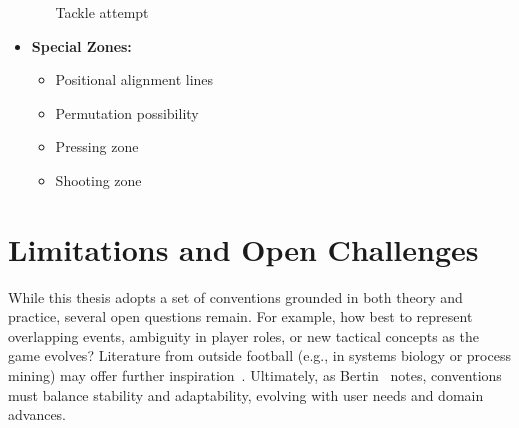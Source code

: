 \documentclass[11pt,a4paper,openright]{report}
\begin{document}
\begin{itemize}
\begin{itemize}
\begin{tikzpicture}[scale=0.5,baseline=-0.6ex]
        \end{tikzpicture}
        \quad Tackle attempt
    \end{itemize}
    \item \textbf{Special Zones:}
    \begin{itemize}
        \item {}
        \quad Positional alignment lines
        \item {}
        \quad Permutation possibility
        \item {}
        \quad Pressing zone
        \item {}
        \quad Shooting zone
    \end{itemize}
\end{itemize}

\section{Limitations and Open Challenges}
While this thesis adopts a set of conventions grounded in both theory and practice, several open questions remain. For example, how best to represent overlapping events, ambiguity in player roles, or new tactical concepts as the game evolves? Literature from outside football (e.g., in systems biology or process mining) may offer further inspiration~\cite{munzner2014visualization, ware2013information}. Ultimately, as Bertin~\cite{bertin2011semiology} notes, conventions must balance stability and adaptability, evolving with user needs and domain advances.



\end{document}
